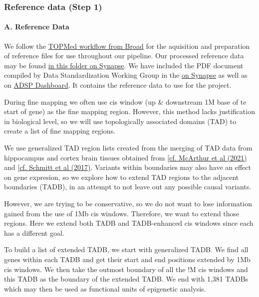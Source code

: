 \documentclass[12pt]{article}
\begin{document}
\subsubsection*{Reference data (Step 1)}

\paragraph*{A.  Reference Data}


We follow the \href{https://github.com/broadinstitute/gtex-pipeline/blob/master/TOPMed\\_RNAseq\\_pipeline.md}{TOPMed workflow from Broad} for the aquisition and preparation of reference files for use throughout our pipeline. Our processed reference data may be found \href{https://www.synapse.org/#!Synapse:syn36416587}{in this folder on Synapse}. We have included the PDF document compiled by Data Standardization Working Group in the \href{https://www.synapse.org/#!Synapse:syn36416587}{on Synapse} as well as on \href{https://www.niagads.org/adsp/content/adspgcadgenomeresources-v2pdf}{ADSP Dashboard}. It contains the reference data to use for the project.




During fine mapping we often use cis window (up & downstream 1M base of te start of gene) as the fine mapping region. However, this method lacks justification in biological level, so we will use topologically associated domains (TAD) to create a list of fine mapping regions.



We use generalized TAD region lists created from the merging of TAD data from hippocampus and cortex brain tissues obtained from \href{https://doi.org/10.1016%2Fj.ajhg.2021.01.001}{[cf. McArthur et al (2021)} and \href{https://doi.org/10.1016%2Fj.celrep.2016.10.061}{[cf. Schmitt et al (2017)}. Variants within boundaries may also have an effect on gene expresion, so we explore how to extend TAD regions to the adjacent boundaries (TADB), in an attempt to not leave out any possible causal variants.



However, we are trying to be conservative, so we do not want to lose information gained from the use of 1Mb cis windows. Therefore, we want to extend those regions. Here we extend both TADB and TADB-enhanced cis windows since each has a different goal.



To build a list of extended TADB, we start with generalized TADB. We find all genes within each TADB and get their start and end positions extended by 1Mb cis windows. We then take the outmost boundary of all the !M cis windows and this TADB as the boundary of the extended TADB. We end with 1,381 TADBs which may then be used as functional units of epigenetic analysis.
\end{document}
